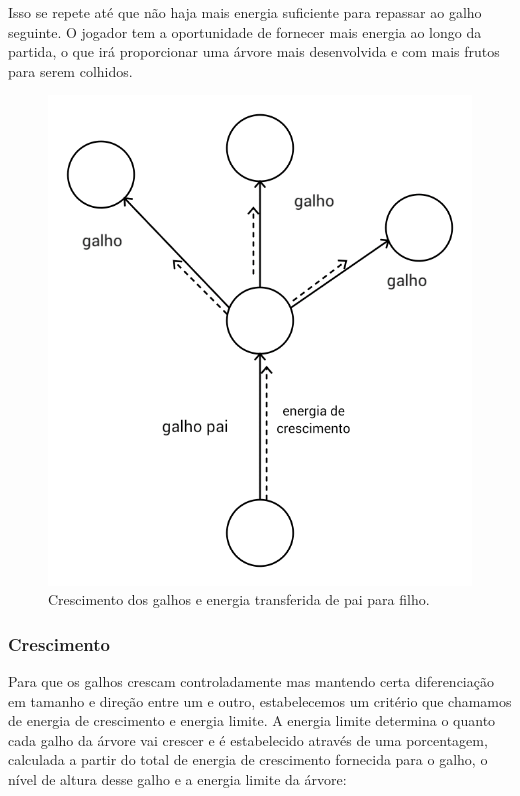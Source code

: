 \documentclass[12pt]{article}
\begin{document}
Isso se repete at\'e que n\~ao haja mais energia suficiente
para repassar ao galho seguinte. O jogador tem a oportunidade de fornecer mais energia ao longo da partida, o que
ir\'a proporcionar uma \'arvore mais desenvolvida e com mais frutos para serem colhidos.

	\begin{figure}[ht!]
	\begin{center}
		\includegraphics[scale=0.2]{img/PI3_Ponto_Crescimento.png}
		\caption{\footnotesize {Crescimento dos galhos e energia transferida de pai para filho.} }
	\end{center}
	\end{figure}	
	
\subsubsection{Crescimento}
Para que os galhos crescam controladamente mas mantendo certa diferencia\c c\~ao em tamanho e
dire\c c\~ao entre um e outro, estabelecemos um crit\'erio que chamamos de energia de crescimento e energia limite.
A energia limite determina o quanto cada  galho da \'arvore vai crescer e \'e estabelecido atrav\'es de uma porcentagem,
calculada a partir do total de energia de crescimento fornecida para o galho, o n\'ivel de altura desse galho e a energia
limite da \'arvore:
\end{document}
